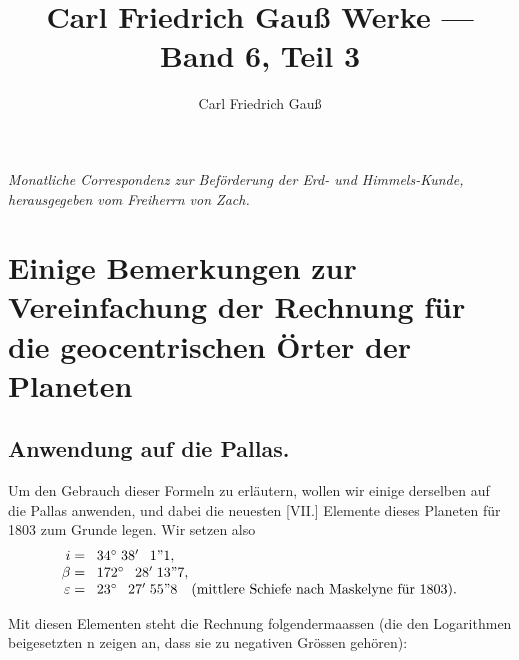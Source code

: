 \documentclass[12pt,a4paper]{article}
\title{Carl Friedrich Gauß Werke --- Band 6, Teil 3}
\author{Carl Friedrich Gauß}
\date{}
\begin{document}
\maketitle
\thispagestyle{empty}

\vspace{2em}
\begin{center}
\textit{Monatliche Correspondenz zur Beförderung der Erd- und Himmels-Kunde,}\\
\textit{herausgegeben vom Freiherrn von Zach.}
\end{center}

\vspace{2em}
\tableofcontents
\newpage

\section{Einige Bemerkungen zur Vereinfachung der Rechnung für die geocentrischen Örter der Planeten}
\label{sec:geocentrischer_ort}


\subsection{Anwendung auf die Pallas.}

Um den Gebrauch dieser Formeln zu erläutern, wollen wir einige derselben
auf die Pallas anwenden, und dabei die neuesten [VII.] Elemente dieses Planeten
für 1803 zum Grunde legen. Wir setzen also
\[
\begin{array}{r@{\;\;\;}l}
i = & 34^{\circ}\;38'\;\phantom{0}1\text{''}1,\\
\beta = & 172^{\circ}\;\phantom{0}28'\;13\text{''}7,\\
\varepsilon = & 23^{\circ}\;\phantom{0}27'\;55\text{''}8 \quad \text{(mittlere Schiefe nach Maskelyne für 1803).}
\end{array}
\]

Mit diesen Elementen steht die Rechnung folgendermaassen (die den Logarithmen
beigesetzten n zeigen an, dass sie zu negativen Grössen gehören):
\end{document}
